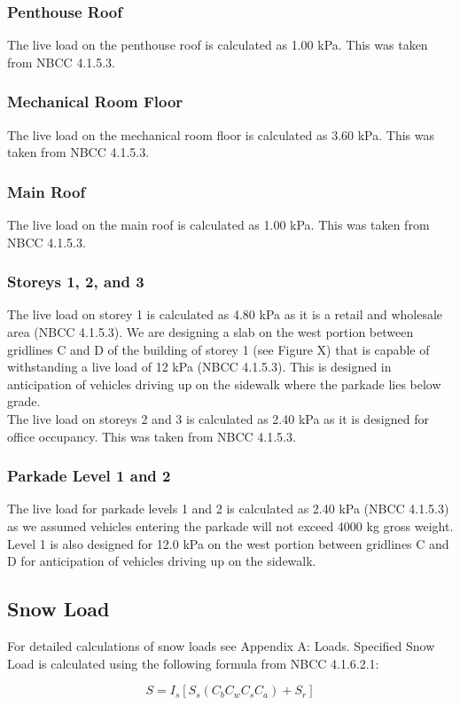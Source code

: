 \documentclass[12pt]{article}
\begin{document}
\subsubsection{Penthouse Roof}
The live load on the penthouse roof is calculated as 1.00 kPa.
This was taken from NBCC 4.1.5.3.
\subsubsection{Mechanical Room Floor}
The live load on the mechanical room floor is calculated as 3.60 kPa.
This was taken from NBCC 4.1.5.3.
\subsubsection{Main Roof}
The live load on the main roof is calculated as 1.00 kPa.
This was taken from NBCC 4.1.5.3.
\subsubsection{Storeys 1, 2, and 3}
The live load on storey 1 is calculated as 4.80 kPa as it is a retail and wholesale area (NBCC 4.1.5.3).
We are designing a slab on the west portion between gridlines C and D of the building of storey 1 (see Figure X) that is capable of withstanding a live load of 12 kPa (NBCC 4.1.5.3). This is designed in anticipation of vehicles driving up on the sidewalk where the parkade lies below grade.\\

The live load on storeys 2 and 3 is calculated as 2.40 kPa as it is designed for office occupancy. This was taken from NBCC 4.1.5.3.
\subsubsection{Parkade Level 1 and 2}
The live load for parkade levels 1 and 2 is calculated as 2.40 kPa (NBCC 4.1.5.3)  as we assumed vehicles entering the parkade will not exceed 4000 kg gross weight.
Level 1 is also designed for 12.0 kPa on the west portion between gridlines C and D for anticipation of vehicles driving up on the sidewalk.
\subsection{Snow Load}
For detailed calculations of snow loads see Appendix A: Loads.
Specified Snow Load is calculated using the following formula from NBCC 4.1.6.2.1:

\begin{equation*}
    S = I_{s}[S_{s}(C_{b}C_{w}C_{s}C_{a})+S_{r}]
\end{equation*}
\end{document}
